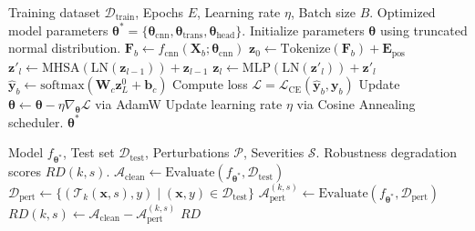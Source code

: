 \documentclass[conference]{IEEEtran}
\begin{document}
\begin{algorithm}[H]
\caption{Training the Hybrid CNN--Vision Transformer}
\label{alg:train_hybrid}
\begin{algorithmic}[1]
\REQUIRE Training dataset $\mathcal{D}_{\text{train}}$, Epochs $E$, Learning rate $\eta$, Batch size $B$.
\ENSURE Optimized model parameters $\boldsymbol{\theta}^* = \{\boldsymbol{\theta}_{\text{cnn}}, \boldsymbol{\theta}_{\text{trans}}, \boldsymbol{\theta}_{\text{head}}\}$.
\STATE Initialize parameters $\boldsymbol{\theta}$ using truncated normal distribution.
        \STATE $\mathbf{F}_b \leftarrow f_{\text{cnn}}(\mathbf{X}_b; \boldsymbol{\theta}_{\text{cnn}})$ 
        \STATE $\mathbf{z}_0 \leftarrow \text{Tokenize}(\mathbf{F}_b) + \mathbf{E}_{\text{pos}}$
            \STATE $\mathbf{z}'_l \leftarrow \text{MHSA}(\text{LN}(\mathbf{z}_{l-1})) + \mathbf{z}_{l-1}$
            \STATE $\mathbf{z}_l \leftarrow \text{MLP}(\text{LN}(\mathbf{z}'_l)) + \mathbf{z}'_l$
        \ENDFOR
        \STATE $\hat{\mathbf{y}}_b \leftarrow \text{softmax}(\mathbf{W}_c \mathbf{z}_L^0 + \mathbf{b}_c)$
        \STATE Compute loss $\mathcal{L} = \mathcal{L}_{\text{CE}}(\hat{\mathbf{y}}_b, \mathbf{y}_b)$
        \STATE Update $\boldsymbol{\theta} \leftarrow \boldsymbol{\theta} - \eta \nabla_{\boldsymbol{\theta}} \mathcal{L}$ via AdamW
    \ENDFOR
    \STATE Update learning rate $\eta$ via Cosine Annealing scheduler.
\ENDFOR
\RETURN $\boldsymbol{\theta}^*$
\end{algorithmic}
\end{algorithm}

\begin{algorithm}[H]
\caption{Robustness Evaluation and Degradation Quantification}
\label{alg:robustness_eval}
\begin{algorithmic}[1]
\REQUIRE Model $f_{\boldsymbol{\theta}^*}$, Test set $\mathcal{D}_{\text{test}}$, Perturbations $\mathcal{P}$, Severities $\mathcal{S}$.
\ENSURE Robustness degradation scores $RD(k, s)$.
\STATE $\mathcal{A}_{\text{clean}} \leftarrow \text{Evaluate}(f_{\boldsymbol{\theta}^*}, \mathcal{D}_{\text{test}})$
        \STATE $\mathcal{D}_{\text{pert}} \leftarrow \{(\mathcal{T}_k(\mathbf{x}, s), y) \mid (\mathbf{x}, y) \in \mathcal{D}_{\text{test}}\}$
        \STATE $\mathcal{A}_{\text{pert}}^{(k, s)} \leftarrow \text{Evaluate}(f_{\boldsymbol{\theta}^*}, \mathcal{D}_{\text{pert}})$
        \STATE $RD(k, s) \leftarrow \mathcal{A}_{\text{clean}} - \mathcal{A}_{\text{pert}}^{(k, s)}$
    \ENDFOR
\ENDFOR
\RETURN $RD$
\end{algorithmic}
\end{algorithm}
\end{document}
